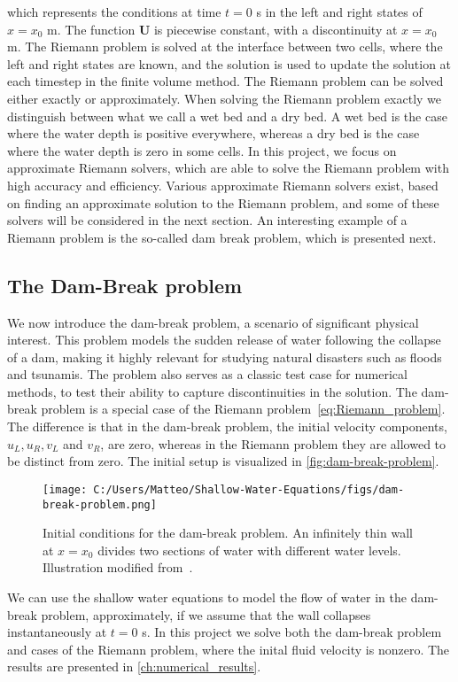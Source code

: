 which represents the conditions at time $t = 0$ s in the left and right states of $x = x_0$ m.
The function $\mathbf{U}$ is piecewise constant, with a discontinuity at $x = x_0$ m.
The Riemann problem is solved at the interface between two cells, where the left and right states are known, and the solution is used to update the solution at each timestep in the finite volume method.
The Riemann problem can be solved either exactly or approximately.
When solving the Riemann problem exactly we distinguish between what we call a wet bed and a dry bed.
A wet bed is the case where the water depth is positive everywhere, whereas a dry bed is the case where the water depth is zero in some cells.
In this project, we focus on approximate Riemann solvers, which are able to solve the Riemann problem with high accuracy and efficiency.
Various approximate Riemann solvers exist, based on finding an approximate solution to the Riemann problem, and some of these solvers will be considered in the next section.
An interesting example of a Riemann problem is the so-called dam break problem, which is presented next.

\subsection{The Dam-Break problem}
We now introduce the dam-break problem, a scenario of significant physical interest.
This problem models the sudden release of water following the collapse of a dam, making it highly relevant for studying natural disasters such as floods and tsunamis.
The problem also serves as a classic test case for numerical methods, to test their ability to capture discontinuities in the solution.
The dam-break problem is a special case of the Riemann problem~\eqref{eq:Riemann_problem}.
The difference is that in the dam-break problem, the initial velocity components, $u_L, u_R, v_L$ and $v_R$, are zero, whereas in the Riemann problem they are allowed to be distinct from zero.
The initial setup is visualized in \autoref{fig:dam-break-problem}.
\begin{figure}[H]
    \centering
    \texttt{[image: C:/Users/Matteo/Shallow-Water-Equations/figs/dam-break-problem.png]}
    \caption{Initial conditions for the dam-break problem. An infinitely thin wall at $x=x_0$ divides two sections of water with different water levels. Illustration modified from~\cite{Toro2024}.}\label{fig:dam-break-problem}
\end{figure}
We can use the shallow water equations to model the flow of water in the dam-break problem, approximately, if we assume that the wall collapses instantaneously at $t=0$ s.
In this project we solve both the dam-break problem and cases of the Riemann problem, where the inital fluid velocity is nonzero.
The results are presented in \autoref{ch:numerical_results}.

